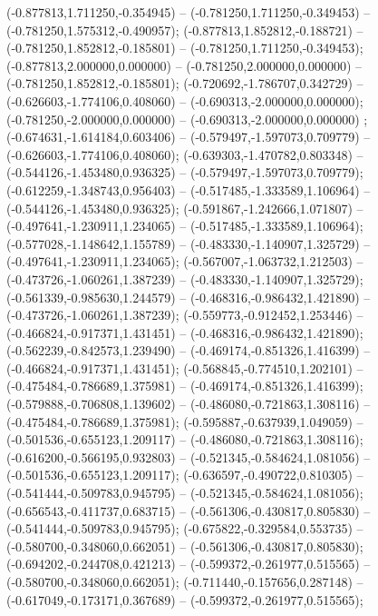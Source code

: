  (-0.877813,1.711250,-0.354945) -- (-0.781250,1.711250,-0.349453) -- (-0.781250,1.575312,-0.490957);
 (-0.877813,1.852812,-0.188721) -- (-0.781250,1.852812,-0.185801) -- (-0.781250,1.711250,-0.349453);
 (-0.877813,2.000000,0.000000) -- (-0.781250,2.000000,0.000000) -- (-0.781250,1.852812,-0.185801);
 (-0.720692,-1.786707,0.342729) -- (-0.626603,-1.774106,0.408060) -- (-0.690313,-2.000000,0.000000);
 (-0.781250,-2.000000,0.000000) -- (-0.690313,-2.000000,0.000000) ;
 (-0.674631,-1.614184,0.603406) -- (-0.579497,-1.597073,0.709779) -- (-0.626603,-1.774106,0.408060);
 (-0.639303,-1.470782,0.803348) -- (-0.544126,-1.453480,0.936325) -- (-0.579497,-1.597073,0.709779);
 (-0.612259,-1.348743,0.956403) -- (-0.517485,-1.333589,1.106964) -- (-0.544126,-1.453480,0.936325);
 (-0.591867,-1.242666,1.071807) -- (-0.497641,-1.230911,1.234065) -- (-0.517485,-1.333589,1.106964);
 (-0.577028,-1.148642,1.155789) -- (-0.483330,-1.140907,1.325729) -- (-0.497641,-1.230911,1.234065);
 (-0.567007,-1.063732,1.212503) -- (-0.473726,-1.060261,1.387239) -- (-0.483330,-1.140907,1.325729);
 (-0.561339,-0.985630,1.244579) -- (-0.468316,-0.986432,1.421890) -- (-0.473726,-1.060261,1.387239);
 (-0.559773,-0.912452,1.253446) -- (-0.466824,-0.917371,1.431451) -- (-0.468316,-0.986432,1.421890);
 (-0.562239,-0.842573,1.239490) -- (-0.469174,-0.851326,1.416399) -- (-0.466824,-0.917371,1.431451);
 (-0.568845,-0.774510,1.202101) -- (-0.475484,-0.786689,1.375981) -- (-0.469174,-0.851326,1.416399);
 (-0.579888,-0.706808,1.139602) -- (-0.486080,-0.721863,1.308116) -- (-0.475484,-0.786689,1.375981);
 (-0.595887,-0.637939,1.049059) -- (-0.501536,-0.655123,1.209117) -- (-0.486080,-0.721863,1.308116);
 (-0.616200,-0.566195,0.932803) -- (-0.521345,-0.584624,1.081056) -- (-0.501536,-0.655123,1.209117);
 (-0.636597,-0.490722,0.810305) -- (-0.541444,-0.509783,0.945795) -- (-0.521345,-0.584624,1.081056);
 (-0.656543,-0.411737,0.683715) -- (-0.561306,-0.430817,0.805830) -- (-0.541444,-0.509783,0.945795);
 (-0.675822,-0.329584,0.553735) -- (-0.580700,-0.348060,0.662051) -- (-0.561306,-0.430817,0.805830);
 (-0.694202,-0.244708,0.421213) -- (-0.599372,-0.261977,0.515565) -- (-0.580700,-0.348060,0.662051);
 (-0.711440,-0.157656,0.287148) -- (-0.617049,-0.173171,0.367689) -- (-0.599372,-0.261977,0.515565);
